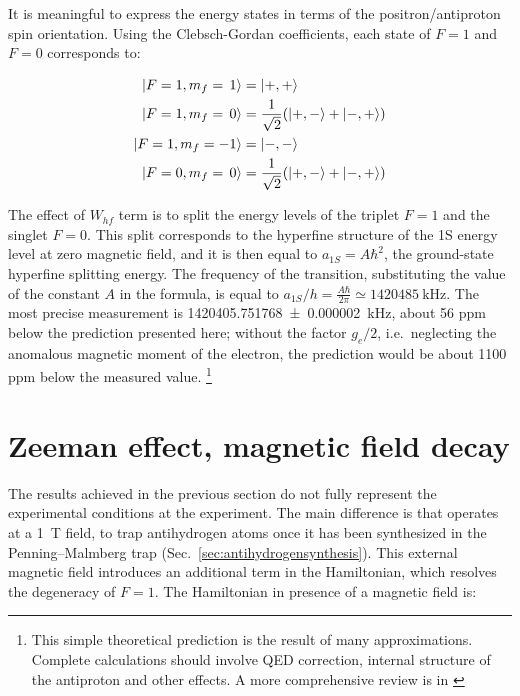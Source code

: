 It is meaningful to express the energy states in terms of the positron/antiproton spin orientation. Using the Clebsch-Gordan coefficients, each state of $F = 1$ and $F = 0$ corresponds to:

\begin{align}\label{eq:ClebschGordon_1/2_1/2}
\ket{F=1,m_{f} = \, 1}  &= \ket{+,+} \\
\ket{F=1,m_{f} = \, 0}  &= \frac{1}{\sqrt{2}} (\ket{+,-} + \ket{-,+}) \\
\ket{F=1,m_{f} = -1} &= \ket{-,-}\\
\ket{F=0,m_f = \, 0}    &= \frac{1}{\sqrt{2}} (\ket{+,-} + \ket{-,+})
\end{align}

The effect of $W_{hf}$ term is to split the energy levels of the triplet $F=1$ and the singlet $F=0$. This split corresponds to the hyperfine structure of the 1S energy level at zero magnetic field, and it is then equal to $a_{1S} = A \hbar^2$, the ground-state hyperfine splitting energy. The frequency of the transition, substituting the value of the constant $A$ in the formula, is equal to $a_{1S}/h = \frac{A \hbar}{2 \pi} \simeq \SI{1420485}{\kilo\hertz}$. The most precise measurement is \SI{1420405.751768(2)}{\kilo\hertz}, about 56 ppm below the prediction presented here; without the factor $g_e/2$, i.e.\ neglecting the anomalous magnetic moment of the electron, the prediction would be about 1100 ppm below the measured value. \footnote{ This simple theoretical prediction is the result of many approximations. Complete calculations should involve QED correction, internal structure of the antiproton and other effects. A more comprehensive review is in \cite{Karshenboim:2005iy}}


\section{Zeeman effect, magnetic field decay}

The results achieved in the previous section do not fully represent the experimental conditions at the \ALPHA experiment. The main difference is that \ALPHA operates at a \SI{1}{\tesla} field, to trap antihydrogen atoms once it has been synthesized in the Penning--Malmberg trap (Sec.~\ref{sec:antihydrogensynthesis}). This external magnetic field introduces an additional term in the Hamiltonian, which resolves the degeneracy of $F = 1$. The Hamiltonian in presence of a magnetic field is:

